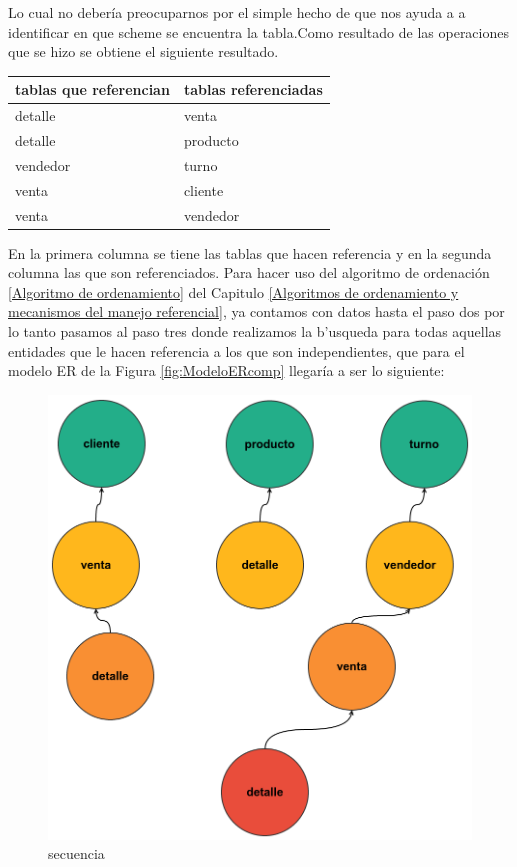 Lo cual no deber\'ia preocuparnos por el simple hecho de que nos ayuda a a identificar en que scheme se encuentra la tabla.Como resultado de las operaciones que se hizo se obtiene el siguiente resultado.
\begin{center}
\scriptsize
  \renewcommand{\arrayrulewidth}{1pt}
  \label{table3} %
\begin{tabular}{|p{40mm}|p{98mm}|}
\hline
\textbf{tablas que referencian} & \textbf{tablas referenciadas} \\ \hline
detalle                         & venta                         \\ \hline
detalle                         & producto                      \\ \hline
vendedor                        & turno                         \\ \hline
venta                        & cliente                       \\ \hline
venta                           & vendedor                      \\ \hline
\end{tabular}
\end{center}
En la primera columna se tiene las tablas que hacen referencia y en la segunda columna las que son referenciados. Para hacer uso del algoritmo de ordenaci\'on \ref{Algoritmo de ordenamiento} del Capitulo \ref{Algoritmos de ordenamiento y mecanismos del manejo referencial},  ya contamos con datos hasta el paso dos por lo tanto pasamos al paso tres donde realizamos la b'usqueda para todas aquellas entidades que le hacen referencia a los que son independientes, que para el modelo ER de la Figura \ref{fig:ModeloERcomp} llegar\'ia a ser lo siguiente:
\begin{figure}[H]
\centering
\includegraphics[scale=0.2]{images/desordenadocomp.png}
\caption{secuencia}
\end{figure}
